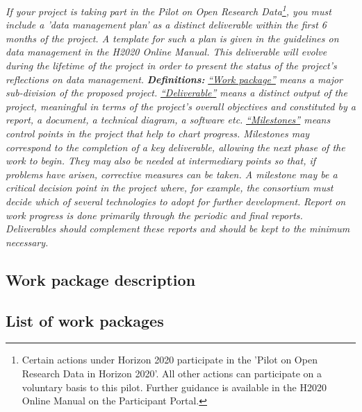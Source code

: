 {\vskip0.2cm
\emph{If your project is taking part in the Pilot on Open Research Data\footnote{Certain actions under Horizon 2020 participate in the 'Pilot on Open Research Data in Horizon 2020'. All other actions can participate on a voluntary basis to this pilot.  Further guidance is available in the H2020 Online Manual on the Participant Portal.}, you must include a 'data management plan' as a distinct deliverable within the first 6 months of the project. A template for such a plan is given in the guidelines on data management in the H2020 Online Manual. This deliverable will evolve during the lifetime of the project in order to present the status of the project's reflections on data management.}
\vskip0.2cm
\emph{\noindent \textbf{Definitions:}}
\vskip0.2cm
\emph{\ul{``Work package''} means a major sub-division of the proposed project.}
\vskip0.2cm
\emph{\ul{``Deliverable''} means a distinct output of the project, meaningful in terms of the project's overall objectives and constituted by a report, a document, a technical diagram, a software etc.}
\vskip0.2cm
\emph{\ul{``Milestones''} means control points in the project that help to chart progress. Milestones may correspond to the completion of a key deliverable, allowing the next phase of the work to begin. They may also be needed at intermediary points so that, if problems have arisen, corrective measures can be taken. A milestone may be a critical decision point in the project where, for example, the consortium must decide which of several technologies to adopt for further development.}
\vskip0.2cm
\emph{\noindent Report on work progress is done primarily through the periodic and final reports. Deliverables should complement these reports and should be kept to the minimum necessary.}
}

%

\subsection{Work package description}
\label{sec:wps}




\subsection{List of work packages}
\label{sec:wplist}
\makewplist

